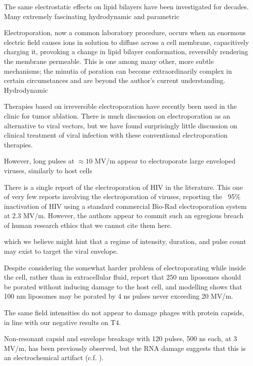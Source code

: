 \documentclass[fleqn,10pt]{article}
\begin{document}
The same electrostatic effects on lipid bilayers have been investigated for decades. Many extremely fascinating hydrodynamic and parametric 


Electroporation\cite{Electroporation1988}, now a common laboratory procedure, occurs when an enormous electric field causes ions in solution to diffuse across a cell membrane, capacitively charging it, provoking a change in lipid bilayer conformation\cite{Membrane2016}, reversibly rendering the membrane permeable. This is one among many other, more subtle mechanisms; the minutia of poration can become extraordinarily complex in certain circumstances and are beyond the author's current understanding\cite{Theoretical2007}. Hydrodynamic

Therapies based on irreversible electroporation\cite{Nonthermal2013}\cite{Lipid2017} have recently been used in the clinic\cite{Irreversible2013} for tumor ablation. There is much discussion on electroporation as an alternative to viral vectors, but we have found surprisingly little discussion on clinical treatment of viral infection with these conventional electroporation therapies.

However, long pulses at $\approx10$ MV/m appear to electroporate large enveloped viruses, similarly to host cells\cite{AC2017}

There is a single report of the electroporation of HIV in the literature. This one of very few reports involving the electroporation of viruses, reporting the ~95\% inactivation of HIV  using a standard commercial Bio-Rad electroporation system at 2.3 MV/m. However, the authors appear to commit such an egregious breach of human research ethics that we cannot cite them here.

 which we believe might hint that a regime of intensity, duration, and pulse count may exist to target the viral envelope. 
 
Despite considering the somewhat harder problem of electroporating while inside the cell, rather than in extracellular fluid, \cite{Electroporation2013} report that 250 nm liposomes should be porated without inducing damage to the host cell, and modelling shows that 100 nm liposomes may be porated by 4 ns pulses never exceeding 20 MV/m. 

The same field intensities do not appear to damage phages with protein capsids\cite{Manipulation2013}, in line with our negative results on T4.

Non-resonant capsid and envelope breakage with 120 pulses, 500 ns each, at 3 MV/m, has been previously observed\cite{Inactivation1990}, but the RNA damage suggests that this is an electrochemical artifact \cite{Formation1996} (c.f. \cite{Microwave1987}). 
\end{document}
